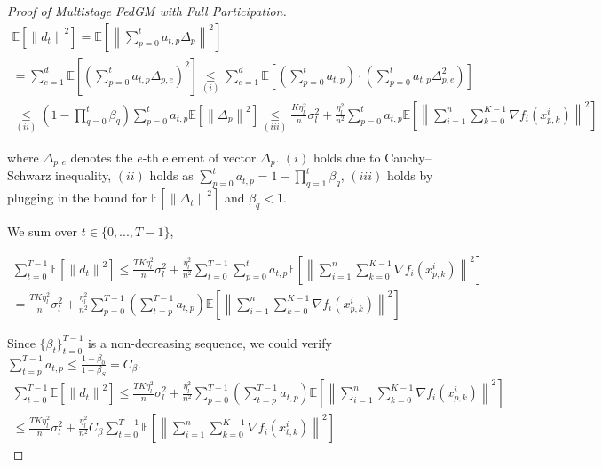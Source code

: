 \begin{proof}[Proof of Multistage FedGM with Full Participation]
\begin{equation}
\begin{gathered}
\mathbb{E}\left[\left\| d_t\right\|^2\right]=\mathbb{E}\left[\left\| \sum_{p=0}^t a_{t,p}\Delta_p\right\|^2\right]\\
= \sum_{e=1}^d \mathbb{E}\left[\left( \sum_{p=0}^t a_{t,p}\Delta_{p,e}\right)^2 \right]
\underset{(i)}{\leq} \sum_{e=1}^d \mathbb{E}\left[\left(\sum_{p=0}^t a_{t,p}\right)\cdot\left(\sum_{p=0}^t a_{t,p}\Delta_{p,e}^2\right)\right]\\
\underset{(ii)}{\leq} \left(1- \prod_{q=0}^t \beta_q\right)\sum_{p=0}^t a_{t,p}\mathbb{E}\left[\left\| \Delta_p \right\|^2\right]
\underset{(iii)}{\leq} \frac{K\eta_l^2}{n} \sigma^2_l + \frac{\eta^2_l}{n^2}\sum_{p=0}^t a_{t,p}\mathbb{E}\left[\left\| \sum_{i=1}^n\sum_{k=0}^{K-1}  \nabla f_i(x_{p,k}^i) \right\|^2\right]
\end{gathered}\nonumber
\end{equation}

where $\Delta_{p,e}$ denotes the $e$-th element of vector $\Delta_p$. $(i)$ holds due to Cauchy–Schwarz inequality, $(ii)$ holds as $\sum_{p=0}^t a_{t,p} = 1- \prod_{q=1}^t \beta_q$, $(iii)$ holds by plugging in the bound for $\mathbb{E}\left[\left\| \Delta_t\right\|^2\right]$ and $\beta_q < 1$.

We sum over $t\in \{0,...,T-1\}$,

\begin{equation}
\begin{gathered}
\sum_{t=0}^{T-1}\mathbb{E}\left[\left\| d_t\right\|^2\right] \leq \frac{T K\eta_l^2}{n} \sigma^2_l + \frac{\eta^2_l}{n^2} \sum_{t=0}^{T-1} \sum_{p=0}^t a_{t,p}\mathbb{E}\left[\left\| \sum_{i=1}^n\sum_{k=0}^{K-1}  \nabla f_i(x_{p,k}^i) \right\|^2\right]\\
=\frac{T K\eta_l^2}{n} \sigma^2_l + \frac{\eta^2_l}{n^2}  \sum_{p=0}^{T-1} \left( \sum_{t=p}^{T-1} a_{t,p} \right) \mathbb{E}\left[\left\| \sum_{i=1}^n\sum_{k=0}^{K-1}  \nabla f_i(x_{p,k}^i) \right\|^2\right]
\end{gathered}\nonumber
\end{equation}

Since $\{\beta_t \}_{t=0}^{T-1}$ is a non-decreasing sequence, we could verify $ \sum_{t=p}^{T-1} a_{t,p} \leq \frac{1-\beta_0}{1-\beta_S}= C_\beta$. 
\begin{equation}
\begin{gathered}
\sum_{t=0}^{T-1}\mathbb{E}\left[\left\| d_t\right\|^2\right] \leq \frac{T K\eta_l^2}{n} \sigma^2_l + \frac{\eta^2_l}{n^2}  \sum_{p=0}^{T-1} \left(\sum_{t=p}^{T-1} a_{t,p}\right)\mathbb{E}\left[\left\| \sum_{i=1}^n\sum_{k=0}^{K-1}  \nabla f_i(x_{p,k}^i) \right\|^2\right]\\
\leq \frac{T K\eta_l^2}{n} \sigma^2_l + \frac{\eta^2_l}{n^2}  C_\beta \sum_{t=0}^{T-1} \mathbb{E}\left[\left\| \sum_{i=1}^n\sum_{k=0}^{K-1}  \nabla f_i(x_{t,k}^i) \right\|^2\right]
\end{gathered}\nonumber
\end{equation}


\end{proof}
